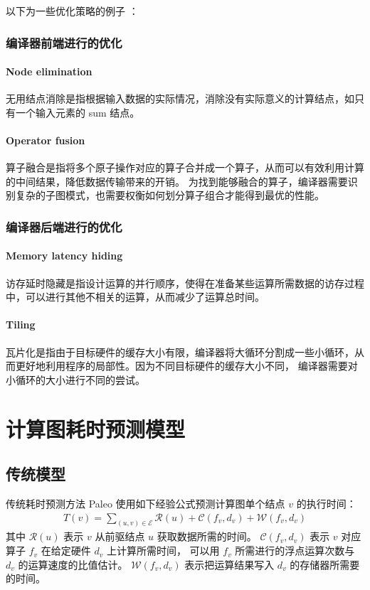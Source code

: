 以下为一些优化策略的例子 \cite{DLcompiler}：

\subsubsection{编译器前端进行的优化}
\paragraph{Node elimination}
无用结点消除是指根据输入数据的实际情况，消除没有实际意义的计算结点，如只有一个输入元素的 sum 结点。
\paragraph{Operator fusion}
算子融合是指将多个原子操作对应的算子合并成一个算子，从而可以有效利用计算的中间结果，降低数据传输带来的开销。
为找到能够融合的算子，编译器需要识别复杂的子图模式，也需要权衡如何划分算子组合才能得到最优的性能。

\subsubsection{编译器后端进行的优化}
\paragraph{Memory latency hiding}
访存延时隐藏是指设计运算的并行顺序，使得在准备某些运算所需数据的访存过程中，可以进行其他不相关的运算，从而减少了运算总时间。
\paragraph{Tiling}
瓦片化是指由于目标硬件的缓存大小有限，编译器将大循环分割成一些小循环，从而更好地利用程序的局部性。因为不同目标硬件的缓存大小不同，
编译器需要对小循环的大小进行不同的尝试。

\newpage
\section{计算图耗时预测模型}

\subsection{传统模型}

传统耗时预测方法 Paleo \cite{Paleo} 使用如下经验公式预测计算图单个结点 $v$ 的执行时间：
\begin{align}
  T(v) = \sum \limits_{(u, v) \in \mathcal{E}}
  \mathcal{R} (u) + \mathcal{C}(f_v,d_v) + \mathcal{W}(f_v,d_v)
\end{align}
其中 $\mathcal{R}(u)$ 表示 $v$ 从前驱结点 $u$ 获取数据所需的时间。
$\mathcal{C}(f_v,d_v)$ 表示 $v$ 对应算子 $f_v$ 在给定硬件 $d_v$ 上计算所需时间，
可以用 $f_v$ 所需进行的浮点运算次数与 $d_v$ 的运算速度的比值估计。
$\mathcal{W}(f_v,d_v)$ 表示把运算结果写入 $d_v$ 的存储器所需要的时间。

